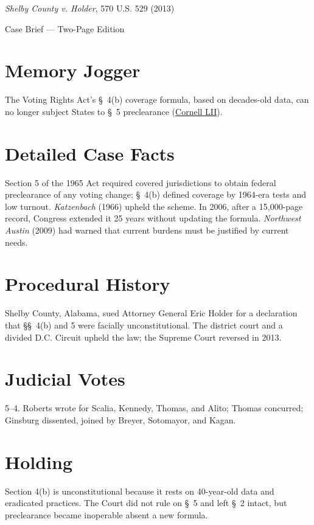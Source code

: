 \documentclass[12pt]{article}
\begin{document}
\begin{center}
{\LARGE \textit{Shelby County v. Holder}, 570 U.S. 529 (2013)\par}
\vspace{0.5em}
{\large Case Brief --- Two-Page Edition\par}
\end{center}

\section{Memory Jogger}
The Voting Rights Act's \S~4(b) coverage formula, based on decades-old data, can no longer subject States to \S~5 preclearance (\href{https://www.law.cornell.edu/supremecourt/text/12-96}{Cornell LII}).

\section{Detailed Case Facts}
Section 5 of the 1965 Act required covered jurisdictions to obtain federal preclearance of any voting change; \S~4(b) defined coverage by 1964-era tests and low turnout. \textit{Katzenbach} (1966) upheld the scheme. In 2006, after a 15,000-page record, Congress extended it 25 years without updating the formula. \textit{Northwest Austin} (2009) had warned that current burdens must be justified by current needs.

\section{Procedural History}
Shelby County, Alabama, sued Attorney General Eric Holder for a declaration that \S\S~4(b) and 5 were facially unconstitutional. The district court and a divided D.C. Circuit upheld the law; the Supreme Court reversed in 2013.

\section{Judicial Votes}
5--4. Roberts wrote for Scalia, Kennedy, Thomas, and Alito; Thomas concurred; Ginsburg dissented, joined by Breyer, Sotomayor, and Kagan.

\section{Holding}
Section 4(b) is unconstitutional because it rests on 40-year-old data and eradicated practices. The Court did not rule on \S~5 and left \S~2 intact, but preclearance became inoperable absent a new formula.
\end{document}

